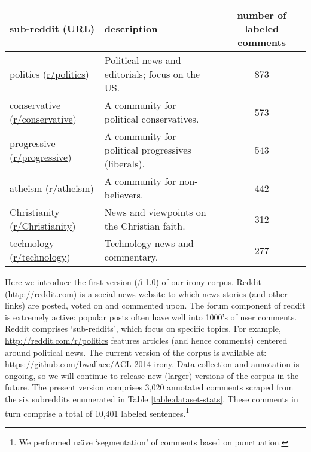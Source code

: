\documentclass[11pt]{article}
\begin{document}
\begin{table*}

	\small
	\begin{tabular}{l l c}%
		\hline
		sub-reddit (URL) & description & number of labeled comments \\
		\hline
		politics (\href{http://reddit.com/r/politics}{r/politics}) & Political news and editorials; focus on the US. & 873\\
		conservative (\href{http://www.reddit.com/r/Conservative/}{r/conservative}) & A community for political conservatives. & 573 \\
		progressive (\href{http://www.reddit.com/r/Progressive/}{r/progressive}) & A community for political progressives (liberals). & 543\\
		atheism (\href{http://reddit.com/r/atheism}{r/atheism}) & A community for non-believers. & 442\\
		Christianity (\href{http://reddit.com/r/Christianity}{r/Christianity}) & News and viewpoints on the Christian faith. & 312\\
		technology (\href{http://reddit.com/r/technology}{r/technology}) & Technology news and commentary. & 277 \\
	\end{tabular}
	

	\caption{The six sub-reddits that we have downloaded comments from and the corresponding number of comments for which we have acquired annotations in this $\beta$ version of the corpus. Note that we acquired labels at the \emph{sentence} level, whereas the counts above reflect \emph{comments}, all of which contain at least one sentence.}
\label{table:dataset-stats}
\end{table*}


Here we introduce the first version ($\beta$ 1.0) of our irony corpus. Reddit (\url{http://reddit.com}) is a social-news website to which news stories (and other links) are posted, voted on and commented upon. The forum component of reddit is extremely active: popular posts often have well into 1000's of user comments. Reddit comprises `sub-reddits', which focus on specific topics. For example, \url{http://reddit.com/r/politics} features articles (and hence comments) centered around political news. The current version of the corpus is available at: \url{https://github.com/bwallace/ACL-2014-irony}. Data collection and annotation is ongoing, so we will continue to release new (larger) versions of the corpus in the future. The present version comprises 3,020 annotated comments scraped from the six subreddits enumerated in Table \ref{table:dataset-stats}. These comments in turn comprise a total of 10,401 labeled sentences.\footnote{We performed na\"{\i}ve `segmentation' of comments based on punctuation.}  
 
\end{document}
